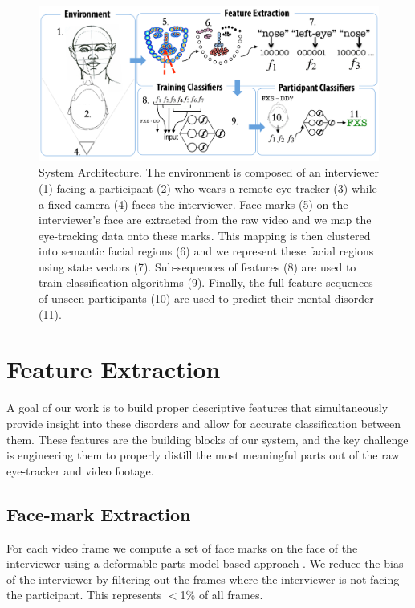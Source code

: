 \documentclass[10pt,twocolumn,letterpaper]{article}
\begin{document}
\begin{figure}[ht]   
\centering
           \includegraphics[width=\textwidth]{figures/system.png}           
 \caption{System Architecture. The environment is composed of an interviewer (1) facing a participant (2) who wears a remote eye-tracker (3) while a fixed-camera (4) faces the interviewer. Face marks (5) on the interviewer's face are extracted from the raw video and we map the eye-tracking data onto these marks. This mapping is then clustered into semantic facial regions (6) and we represent these facial regions using state vectors (7). Sub-sequences of features (8) are used to train classification algorithms (9). Finally, the full feature sequences of  unseen participants (10) are used to predict their mental disorder (11).}
\label{fig:system_architecture}
\end{figure}

\section{Feature Extraction}
\label{sec:feature_extraction}
A goal of our work is to build proper descriptive features that simultaneously provide insight into these disorders and allow for accurate classification between them. These features are the building blocks of our system, and the key challenge is engineering them to properly distill the most meaningful parts out of the raw eye-tracker and video footage.  

\subsection{Face-mark Extraction}
For each video frame we compute a set of face marks on the face of the interviewer using a deformable-parts-model based approach \cite{dpmface}. We reduce the bias of the interviewer by filtering out the frames where the interviewer is not facing the participant. This represents $<$1\% of all frames.
\end{document}

